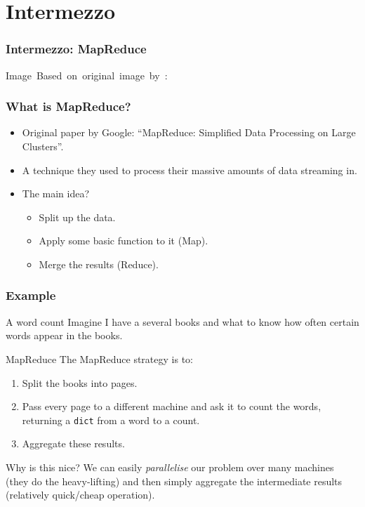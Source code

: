 \section{Intermezzo}
\label{sec:intermezzo}

\begin{frame}
	\frametitle{Intermezzo: MapReduce}
	
	\begin{center}
	
	\hspace*{15pt}\hbox{\scriptsize Image Based on original image by :}
	\end{center}
\end{frame}

\begin{frame}
	\frametitle{What is MapReduce?}
	\begin{itemize}
		\item Original paper by Google: ``MapReduce: Simplified Data Processing on Large Clusters''.
		\item A technique they used to process their massive amounts of data streaming in.
			\pause
		\item The main idea?
			\begin{itemize}
				\item Split up the data.
				\item Apply some basic function to it (Map).
				\item Merge the results (Reduce).
			\end{itemize}
	\end{itemize}
\end{frame}

\begin{frame}
	\frametitle{Example}
		\begin{problemblock}{A word count}
			Imagine I have a several books and what to know how often certain words appear in the books.	\\
		\end{problemblock}	
		\pause
		\begin{answerblock}{MapReduce}
			The MapReduce strategy is to:
		\begin{enumerate}
			\item Split the books into pages.
			\item Pass every page to a different machine and ask it to count the words, returning a \texttt{dict} from a word
				to a count.
			\item Aggregate these results.
		\end{enumerate}
			
		\end{answerblock}
		\pause
			\begin{exampleblock}{Why is this nice?}
				We can easily \textit{parallelise} our problem over many machines (they do the heavy-lifting) and then simply
				aggregate the intermediate results (relatively quick/cheap operation).	
			\end{exampleblock}	
\end{frame}

